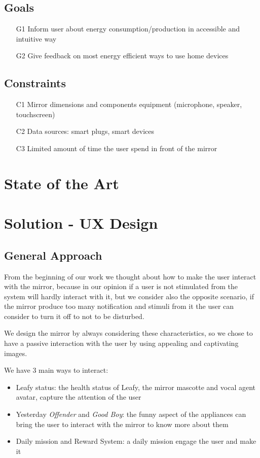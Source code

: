 \documentclass{article}
\begin{document}
    \subsection{Goals}
    \begin{itemize}
        \item[G1] Inform user about energy consumption/production in accessible and intuitive way
        \item[G2] Give feedback on most energy efficient ways to use home devices
    \end{itemize}
    \subsection{Constraints}
    \begin{itemize}
        \item[C1] Mirror dimensions and components equipment (microphone, speaker, touchscreen)
        \item[C2] Data sources: smart plugs, smart devices
        \item[C3] Limited amount of time the user spend in front of the mirror
    \end{itemize}
    \newpage

    \section{State of the Art}

    \newpage

    \section{Solution - UX Design}
    \subsection{General Approach}
    From the beginning of our work we thought about how to make the user interact with the mirror, because in our opinion if a user is not stimulated from the system will hardly interact with it, but we consider also the opposite scenario, if the mirror produce too many notification and stimuli from it the user can consider to turn it off to not to be disturbed.

    We design the mirror by always considering these characteristics, so we chose to have a passive interaction with the user by using appealing and captivating images.

    We have 3 main ways to interact:
    \begin{itemize}
        \item Leafy status: the health status of Leafy, the mirror mascotte and vocal agent avatar, capture the attention of the user
        \item Yesterday \textit{Offender} and \textit{Good Boy}: the funny aspect of the appliances can bring the user to interact with the mirror to know more about them
        \item Daily mission and Reward System: a daily mission engage the user and make it
    \end{itemize}
\end{document}
